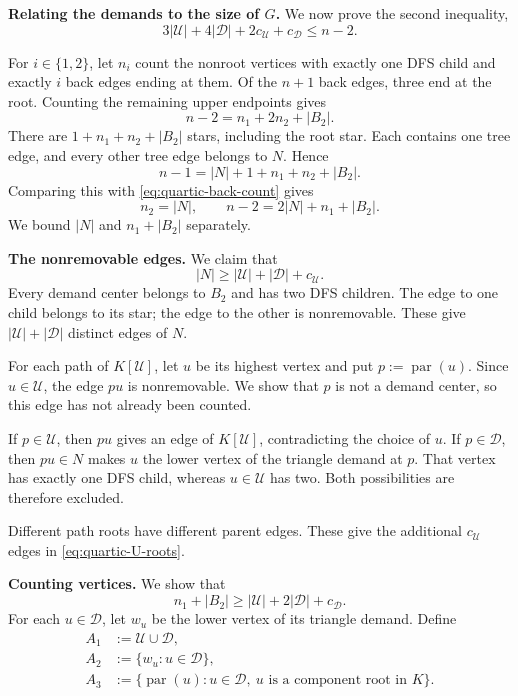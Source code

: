 \documentclass[11pt]{amsart}
\newcommand{\1}{\mathbbm{1}}
\begin{document}
\smallskip\noindent
\textbf{Relating the demands to the size of $G$.}
We now prove the second inequality,
\[
 3|\mathcal U|+4|\mathcal D|
 +2c_{\mathcal U}+c_{\mathcal D}\le n-2.
\]

For $i\in\{1,2\}$, let $n_i$ count the nonroot vertices
with exactly one DFS child and exactly $i$ back edges
ending at them. Of the $n+1$ back edges, three end at
the root. Counting the remaining upper endpoints gives
\begin{equation}
\label{eq:quartic-back-count}
 n-2=n_1+2n_2+|B_2|.
\end{equation}
There are $1+n_1+n_2+|B_2|$ stars, including the root
star. Each contains one tree edge, and every other tree
edge belongs to $N$. Hence
\[
 n-1=|N|+1+n_1+n_2+|B_2|.
\]
Comparing this with \eqref{eq:quartic-back-count} gives
\begin{equation}
\label{eq:quartic-N-count}
 n_2=|N|,
 \qquad
 n-2=2|N|+n_1+|B_2|.
\end{equation}
We bound $|N|$ and $n_1+|B_2|$ separately.

\smallskip\noindent
\textbf{The nonremovable edges.}
We claim that
\begin{equation}
\label{eq:quartic-U-roots}
 |N|\ge|\mathcal U|+|\mathcal D|+c_{\mathcal U}.
\end{equation}
Every demand center belongs to $B_2$ and has two DFS
children. The edge to one child belongs to its star;
the edge to the other is nonremovable. These give
$|\mathcal U|+|\mathcal D|$ distinct edges of $N$.

For each path of $K[\mathcal U]$, let $u$ be its highest
vertex and put $p:=\operatorname{par}(u)$.
Since $u\in\mathcal U$, the edge $pu$ is nonremovable.
We show that $p$ is not a demand center, so this edge
has not already been counted.

If $p\in\mathcal U$, then $pu$ gives an edge of
$K[\mathcal U]$, contradicting the choice of $u$.
If $p\in\mathcal D$, then $pu\in N$ makes $u$ the lower
vertex of the triangle demand at $p$. That vertex has
exactly one DFS child, whereas $u\in\mathcal U$ has two.
Both possibilities are therefore excluded.

Different path roots have different parent edges.
These give the additional $c_{\mathcal U}$ edges in
\eqref{eq:quartic-U-roots}.

\smallskip\noindent
\textbf{Counting vertices.}
We show that
\begin{equation}
\label{eq:quartic-D-roots}
 n_1+|B_2|
 \ge|\mathcal U|+2|\mathcal D|+c_{\mathcal D}.
\end{equation}
For each $u\in\mathcal D$, let $w_u$ be the lower vertex
of its triangle demand. Define
\[
 \begin{aligned}
 A_1&:=\mathcal U\cup\mathcal D,\\
 A_2&:=\{w_u:u\in\mathcal D\},\\
 A_3&:=\{\operatorname{par}(u):u\in\mathcal D,\ 
          u\text{ is a component root in }K\}.
 \end{aligned}
\]
\end{document}
